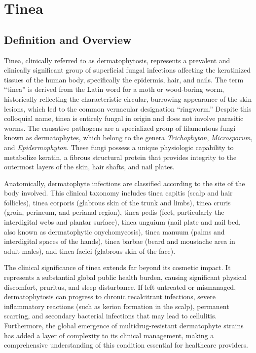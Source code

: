 \chapter{Tinea}

\section*{Definition and Overview}
Tinea, clinically referred to as dermatophytosis, represents a prevalent and clinically significant group of superficial fungal infections affecting the keratinized tissues of the human body, specifically the epidermis, hair, and nails. The term ``tinea'' is derived from the Latin word for a moth or wood-boring worm, historically reflecting the characteristic circular, burrowing appearance of the skin lesions, which led to the common vernacular designation ``ringworm.'' Despite this colloquial name, tinea is entirely fungal in origin and does not involve parasitic worms. The causative pathogens are a specialized group of filamentous fungi known as dermatophytes, which belong to the genera \textit{Trichophyton}, \textit{Microsporum}, and \textit{Epidermophyton}. These fungi possess a unique physiologic capability to metabolize keratin, a fibrous structural protein that provides integrity to the outermost layers of the skin, hair shafts, and nail plates.

Anatomically, dermatophyte infections are classified according to the site of the body involved. This clinical taxonomy includes tinea capitis (scalp and hair follicles), tinea corporis (glabrous skin of the trunk and limbs), tinea cruris (groin, perineum, and perianal region), tinea pedis (feet, particularly the interdigital webs and plantar surface), tinea unguium (nail plate and nail bed, also known as dermatophytic onychomycosis), tinea manuum (palms and interdigital spaces of the hands), tinea barbae (beard and moustache area in adult males), and tinea faciei (glabrous skin of the face).

The clinical significance of tinea extends far beyond its cosmetic impact. It represents a substantial global public health burden, causing significant physical discomfort, pruritus, and sleep disturbance. If left untreated or mismanaged, dermatophytosis can progress to chronic recalcitrant infections, severe inflammatory reactions (such as kerion formation in the scalp), permanent scarring, and secondary bacterial infections that may lead to cellulitis. Furthermore, the global emergence of multidrug-resistant dermatophyte strains has added a layer of complexity to its clinical management, making a comprehensive understanding of this condition essential for healthcare providers.

